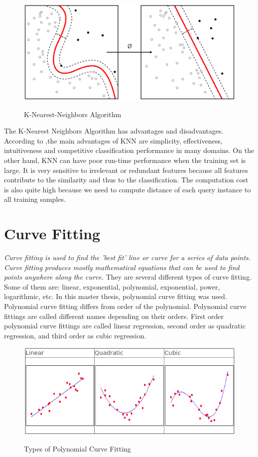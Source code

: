 \begin{figure}[H]
 \centering
  \includegraphics[width=1\textwidth]{./Bilder/k-nearest-neighbors.png}\label{Procedures_of_IPM}
  \caption{K-Nearest-Neighbors Algorithm\cite{k_nearest_neighbors_wikipedia}}
\end{figure}

The K-Nearest Neighbors Algorithm has advantages and disadvantages. According to \cite{k_nearest_neighbors_adv_disadv},the main advantages of KNN are simplicity, effectiveness, intuitiveness and competitive classification performance in many domains. On the other hand, KNN can have poor run-time performance when the training set is large. It is very sensitive to irrelevant or redundant features because all features contribute to the similarity and thus to the classification. The computation cost is also quite high because we need to compute distance of each query instance to all training samples. 

%
\section{Curve Fitting}\label{sec:Curve Fitting}

\emph{\color{red}Curve fitting is used to find the 'best fit' line or curve for a series of data points. Curve fitting produces mostly mathematical equations that can be used to find points anywhere along
the curve.\cite{Curve_Fitting}} They are several different types of curve fitting. Some of them are: linear, exponential, polynomial, exponential, power, logarithmic, etc. In this master thesis, polynomial curve fitting was used. Polynomial curve fitting differs from order of the polynomial. Polynomial curve fittings are called different names depending on their orders. First order polynomial curve fittings are called linear regression, second order as quadratic regression, and third order as cubic regression.

\begin{figure}[H]
 \centering
  \includegraphics[width=1\textwidth]{./Bilder/Curve_Fitting_Polynomial.png}\label{Curve_Fitting_Polynomial}
  \caption{Types of Polynomial Curve Fitting\cite{Curve_Fitting_Polynomial}}
\end{figure}

%




